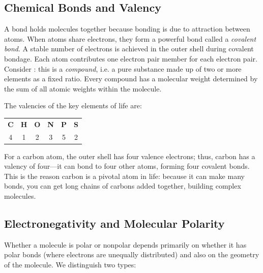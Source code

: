 \documentclass{report}
\begin{document}
\subsection{Chemical Bonds and Valency}

A bond holds molecules together because bonding is due to attraction between atoms. When atoms share electrons, they form a powerful bond called a \emph{covalent bond}. A stable number of electrons is achieved in the outer shell during covalent bondage. Each atom contributes one electron pair member for each electron pair. Consider : this is a \emph{compound}, i.e. a pure substance made up of two or more elements as a fixed ratio. Every compound has a molecular weight determined by the sum of all atomic weights within the molecule.


The valencies of the key elements of life are:
\begin{center}
\begin{tabular}{cccccc}
\textbf{C} & \textbf{H} & \textbf{O} & \textbf{N} & \textbf{P} & \textbf{S} \\
4 & 1 & 2 & 3 & 5 & 2
\end{tabular}
\end{center}

For a carbon atom, the outer shell has four valence electrons; thus, carbon has a valency of four---it can bond to four other atoms, forming four covalent bonds. This is the reason carbon is a pivotal atom in life: because it can make many bonds, you can get long chains of carbons added together, building complex molecules.

\subsection{Electronegativity and Molecular Polarity}


Whether a molecule is polar or nonpolar depends primarily on whether it has polar bonds (where electrons are unequally distributed) and also on the geometry of the molecule. We distinguish two types:
\end{document}
